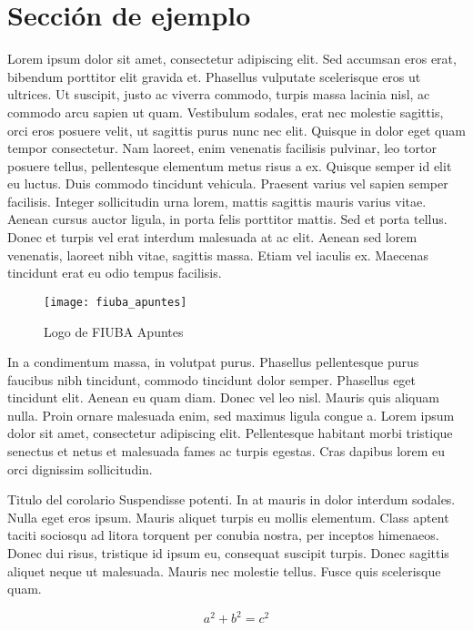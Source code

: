 \documentclass[a4paper, twoside]{article}
\begin{document}
\section{Sección de ejemplo}

Lorem ipsum dolor sit amet, consectetur adipiscing elit. Sed accumsan eros erat, bibendum porttitor elit gravida et. Phasellus vulputate scelerisque eros ut ultrices. Ut suscipit, justo ac viverra commodo, turpis massa lacinia nisl, ac commodo arcu sapien ut quam. Vestibulum sodales, erat nec molestie sagittis, orci eros posuere velit, ut sagittis purus nunc nec elit. Quisque in dolor eget quam tempor consectetur. Nam laoreet, enim venenatis facilisis pulvinar, leo tortor posuere tellus, pellentesque elementum metus risus a ex. Quisque semper id elit eu luctus. Duis commodo tincidunt vehicula. Praesent varius vel sapien semper facilisis. Integer sollicitudin urna lorem, mattis sagittis mauris varius vitae. Aenean cursus auctor ligula, in porta felis porttitor mattis. Sed et porta tellus. Donec et turpis vel erat interdum malesuada at ac elit. Aenean sed lorem venenatis, laoreet nibh vitae, sagittis massa. Etiam vel iaculis ex. Maecenas tincidunt erat eu odio tempus facilisis.

\begin{figure}[H] %
	\centering %
	\texttt{[image: fiuba\_apuntes]} %
	\caption{Logo de FIUBA Apuntes} %
	\label{fig:fiuba_apuntes} %
\end{figure}

In a condimentum massa, in volutpat purus. Phasellus pellentesque purus faucibus nibh tincidunt, commodo tincidunt dolor semper. Phasellus eget tincidunt elit. Aenean eu quam diam. Donec vel leo nisl. Mauris quis aliquam nulla. Proin ornare malesuada enim, sed maximus ligula congue a. Lorem ipsum dolor sit amet, consectetur adipiscing elit. Pellentesque habitant morbi tristique senectus et netus et malesuada fames ac turpis egestas. Cras dapibus lorem eu orci dignissim sollicitudin.

\begin{corolario*}{Titulo del corolario} %
	Suspendisse potenti. In at mauris in dolor interdum sodales. Nulla eget eros ipsum. Mauris aliquet turpis eu mollis elementum. Class aptent taciti sociosqu ad litora torquent per conubia nostra, per inceptos himenaeos. Donec dui risus, tristique id ipsum eu, consequat suscipit turpis. Donec sagittis aliquet neque ut malesuada. Mauris nec molestie tellus. Fusce quis scelerisque quam.
	
	\begin{equation*} %
		a^2 + b^2 = c^2
	\end{equation*}
\end{corolario*}
\end{document}

